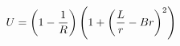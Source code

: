 \documentclass[preview]{standalone}
\begin{document}
\begin{align*}
U=\left(1-{1\over R}\right)\left(1+\left({L\over r}-Br\right)^2\right)
\end{align*}
\end{document}
